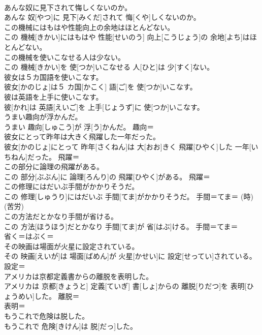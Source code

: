 \documentclass[8pt]{extreport}
\begin{document}
\begin{CJK}{UTF8}{min}
\\	あんな奴に見下されて悔しくないのか。	
\\	あんな 奴[やつ]に 見下[みくだ]されて 悔[くや]しくないのか。	
\\	この機械にはもはや性能向上の余地はほとんどない。	
\\	この 機械[きかい]にはもはや 性能[せいのう] 向上[こうじょう]の 余地[よち]はほとんどない。	
\\	この機械を使いこなせる人は少ない。	
\\	この 機械[きかい]を 使[つか]いこなせる 人[ひと]は 少[すく]ない。	
\\	彼女は５カ国語を使いこなす。	
\\	彼女[かのじょ]は５ カ国[かこく] 語[ご]を 使[つか]いこなす。	
\\	彼は英語を上手に使いこなす。	
\\	彼[かれ]は 英語[えいご]を 上手[じょうず]に 使[つか]いこなす。	
\\	うまい趣向が浮かんだ。	
\\	うまい 趣向[しゅこう]が 浮[う]かんだ。	趣向＝ 
\\	彼女にとって昨年は大きく飛躍した一年だった。	
\\	彼女[かのじょ]にとって 昨年[さくねん]は 大[おお]きく 飛躍[ひやく]した 一年[いちねん]だった。	飛躍＝ 
\\	この部分に論理の飛躍がある。	
\\	この 部分[ぶぶん]に 論理[ろんり]の 飛躍[ひやく]がある。	飛躍＝ 
\\	この修理にはだいぶ手間がかかりそうだ。	
\\	この 修理[しゅうり]にはだいぶ 手間[てま]がかかりそうだ。	手間＝てま＝ (時) 
\\	(苦労) 
\\	この方法だとかなり手間が省ける。	
\\	この 方法[ほうほう]だとかなり 手間[てま]が 省[はぶ]ける。	手間＝てま＝ 
\\	省く＝はぶく＝ 
\\	その映画は場面が火星に設定されている。	
\\	その 映画[えいが]は 場面[ばめん]が 火星[かせい]に 設定[せってい]されている。	設定＝ 
\\	アメリカは京都定義書からの離脱を表明した。	
\\	アメリカは 京都[きょうと] 定義[ていぎ] 書[しょ]からの 離脱[りだつ]を 表明[ひょうめい]した。	離脱＝ 
\\	表明＝ 
\\	もうこれで危険は脱した。	
\\	もうこれで 危険[きけん]は 脱[だっ]した。	

\end{CJK}
\end{document}
